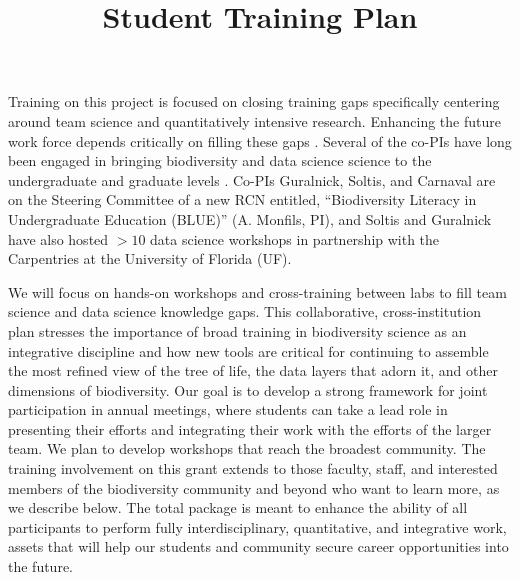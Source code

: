 \documentclass[11pt]{article}
\title{Student Training Plan \vspace{-1.5ex}}
\author{}
\date{}
\begin{document}
\maketitle
\vspace{-6em}




Training on this project is focused on closing training gaps
specifically centering around team science and quantitatively
intensive research.
Enhancing the future work force depends critically on filling these
gaps \citep{woodin2010}. Several of the co-PIs have long been engaged
in bringing biodiversity and data science science to the undergraduate
and graduate levels \citep[e.g.,][]{cook2014, lacey2017}. Co-PIs
Guralnick, Soltis, and Carnaval are on the Steering Committee of a new
RCN entitled, ``Biodiversity Literacy in Undergraduate Education
(BLUE)'' (A. Monfils, PI), and Soltis and Guralnick have also hosted
$>10$ data science workshops in partnership with the Carpentries at
the University of Florida (UF). 

We will focus on hands-on workshops and cross-training between labs to
fill team science and data science knowledge gaps. This collaborative,
cross-institution plan stresses the importance of broad training in
biodiversity science as an integrative discipline and how new tools
are critical for continuing to assemble the most refined view of the
tree of life, the data layers that adorn it, and other dimensions of
biodiversity.  Our goal is to develop a strong framework for joint
participation in annual meetings, where students can take a lead role
in presenting their efforts and integrating their work with the
efforts of the larger team.  We plan to develop workshops that reach
the broadest community.  The training involvement on this grant
extends to those faculty, staff, and interested members of the
biodiversity community and beyond who want to learn more, as we
describe below. The total package is meant to enhance the ability of
all participants to perform fully interdisciplinary, quantitative, and
integrative work, assets that will help our students and community
secure career opportunities into the future.
\end{document}
